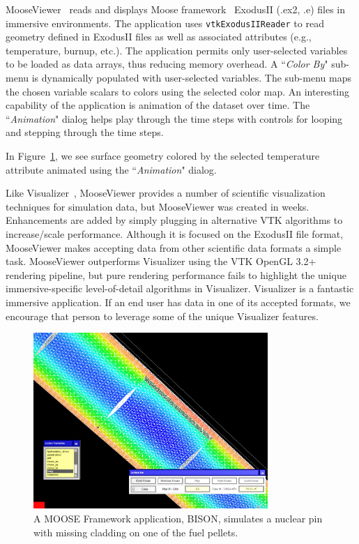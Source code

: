 MooseViewer~\cite{MooseViewer} reads and displays Moose framework~\cite{Gaston:2015, MooseFramework} ExodusII (.ex2, .e) files in immersive environments. The application uses \texttt{vtkExodusIIReader} to read geometry defined in ExodusII files as well as associated attributes (e.g., temperature, burnup, etc.). The application permits only user-selected variables to be loaded as data arrays, thus reducing memory overhead. A ``\textit{Color By}" sub-menu is dynamically populated with user-selected variables. The sub-menu maps the chosen variable scalars to colors using the selected color map.
An interesting capability of the application is animation of the dataset over time.
The ``\textit{Animation}" dialog helps play through the time steps with controls for looping and stepping through the time steps.

In Figure~\ref{fig:fuelpin}, we see surface geometry colored by the selected temperature attribute animated using the ``\textit{Animation}" dialog.

Like Visualizer~\cite{Billen:2008}, MooseViewer provides a number of scientific visualization techniques for simulation data, but MooseViewer was created in weeks. Enhancements are added by simply plugging in alternative VTK algorithms to increase/scale performance.  Although it is focused on the ExodusII file format, MooseViewer makes accepting data from other scientific data formats a simple task. MooseViewer outperforms Visualizer using the VTK OpenGL 3.2+ rendering pipeline, but pure rendering performance fails to highlight the unique immersive-specific level-of-detail algorithms in Visualizer. Visualizer is a fantastic immersive application. If an end user has data in one of its accepted formats, we encourage that person to leverage some of the unique Visualizer features.

\begin{figure}[h!]
 \centering
 \includegraphics[width=3.5in]{images/fuelpin.png}
 \caption{A MOOSE Framework application, BISON, simulates a nuclear pin with missing cladding on one of the fuel pellets.}
 \label{fig:fuelpin}
\end{figure}

